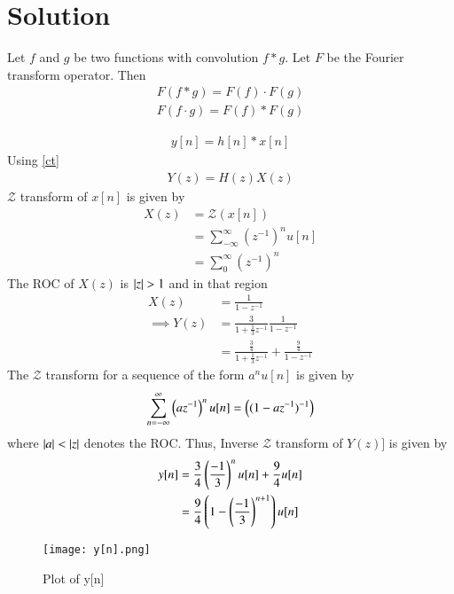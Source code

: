 \documentclass[journal,12pt,twocolumn]{IEEEtran}
\begin{document}
\section{Solution}
\begin{theorem} \label{ct}
Let $f$ and $g$ be two functions with convolution $f*g$. Let $F$ be the Fourier transform operator. Then
\begin{align}
F(f * g)=F(f) \cdot F(g)\\
F(f \cdot g)=F(f) * F(g)
\end{align}
\end{theorem}
\begin{align}
    y[n]=h[n]*x[n]
\end{align}
Using \ref{ct} 
\begin{align}
    Y(z)=H(z)X(z)
\end{align}
$\mathcal{Z}$ transform of $x[n]$ is given by
\begin{align}
    X(z)&=\mathcal{Z}(x[n])\\
    &=\sum_{-\infty}^{\infty}(z^{-1})^nu[n]\\
    &=\sum_{0}^{\infty}(z^{-1})^n
\end{align}
The ROC of $X(z)$ is $\vert z\vert>1$ and in that region
\begin{align}
    X(z)&=\frac{1}{1-z^{-1}}\\
    \implies Y(z)&=\frac{3}{1+\frac{1}{3}z^{-1}} \frac{1}{1-z^{-1}}\\
    &=\frac{\frac{3}{4}}{1+\frac{1}{3}z^{-1}}+\frac{\frac{9}{4}}{1-z^{-1}}
\end{align}
The $\mathcal{Z}$ transform for a sequence of the form $a^{n}u[n]$ is given by
\begin{align}\label{Z1}
\sum _{n=-\infty }^{\infty }\left({az^{-1}}\right)^n u[n]
=\left(({1-az^{-1}})^{-1}\right)
\end{align}
where $\vert a\vert<\vert z\vert$ denotes the ROC.
Thus, Inverse $\mathcal{Z}$ transform of $Y(z)]$ is given by
\begin{align}
    y[n]&=\frac{3}{4}\left(\frac{-1}{3}\right)^nu[n]+\frac{9}{4}u[n]\\
    &=\frac{9}{4}\left(1-\left(\frac{-1}{3}\right)^{n+1}\right)u[n]
\end{align}
\begin{figure}[!h]
         \centering
         \texttt{[image: y[n].png]}
         \caption{Plot of y[n]}
         \label{plot}
\end{figure}
\end{document}
